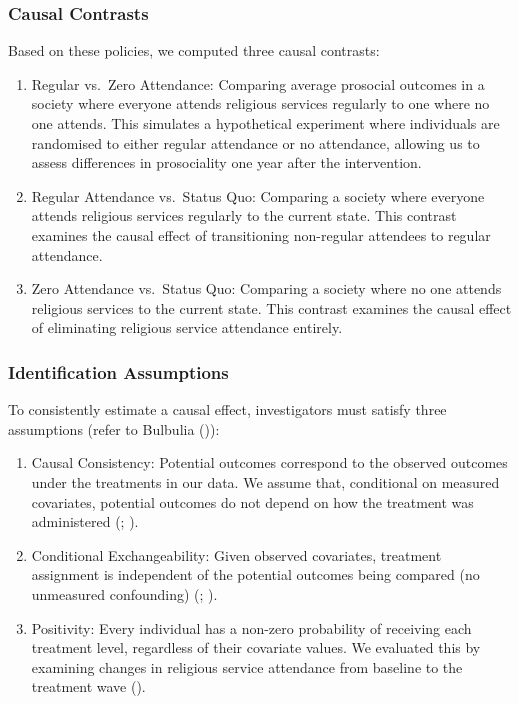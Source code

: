 \documentclass[
  single column]{article}
\providecommand{\tightlist}{%
  \setlength{\itemsep}{0pt}\setlength{\parskip}{0pt}}\usepackage{longtable,booktabs,array}
\begin{document}
\subsubsection{Causal Contrasts}\label{causal-contrasts}

Based on these policies, we computed three causal contrasts:

\begin{enumerate}
\def\labelenumi{\arabic{enumi}.}
\tightlist
\item
  Regular vs.~Zero Attendance: Comparing average prosocial outcomes in a
  society where everyone attends religious services regularly to one
  where no one attends. This simulates a hypothetical experiment where
  individuals are randomised to either regular attendance or no
  attendance, allowing us to assess differences in prosociality one year
  after the intervention.
\item
  Regular Attendance vs.~Status Quo: Comparing a society where everyone
  attends religious services regularly to the current state. This
  contrast examines the causal effect of transitioning non-regular
  attendees to regular attendance.
\item
  Zero Attendance vs.~Status Quo: Comparing a society where no one
  attends religious services to the current state. This contrast
  examines the causal effect of eliminating religious service attendance
  entirely.
\end{enumerate}

\subsubsection{Identification
Assumptions}\label{identification-assumptions}

To consistently estimate a causal effect, investigators must satisfy
three assumptions (refer to Bulbulia
()):

\begin{enumerate}
\def\labelenumi{\arabic{enumi}.}
\item
  Causal Consistency: Potential outcomes correspond to the observed
  outcomes under the treatments in our data. We assume that, conditional
  on measured covariates, potential outcomes do not depend on how the
  treatment was administered (; ).
\item
  Conditional Exchangeability: Given observed covariates, treatment
  assignment is independent of the potential outcomes being compared (no
  unmeasured confounding) (; ).
\item
  Positivity: Every individual has a non-zero probability of receiving
  each treatment level, regardless of their covariate values. We
  evaluated this by examining changes in religious service attendance
  from baseline to the treatment wave
  ().
\end{enumerate}
\end{document}
